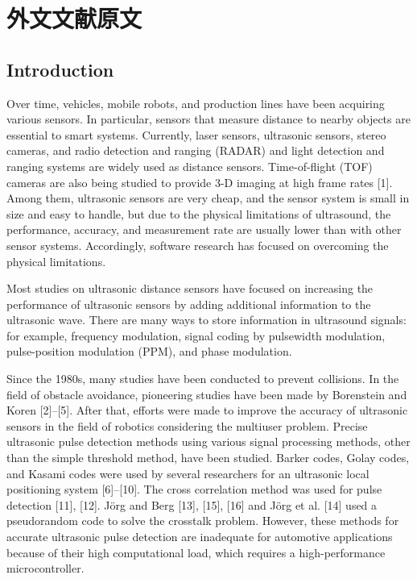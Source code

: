 \section{外文文献原文}
\subsection{Introduction}
Over time, vehicles, mobile robots, and production lines have been acquiring various sensors. In particular, sensors that measure distance to nearby objects are essential to smart systems. Currently, laser sensors, ultrasonic sensors, stereo cameras, and radio detection and ranging (RADAR) and light detection and ranging systems are widely used as distance sensors. Time-of-flight (TOF) cameras are also being studied to provide 3-D imaging at high frame rates [1]. Among them, ultrasonic sensors are very cheap, and the sensor system is small in size and easy to handle, but due to the physical limitations of ultrasound, the performance, accuracy, and measurement rate are usually lower than with other sensor systems. Accordingly, software research has focused on overcoming the physical limitations.

Most studies on ultrasonic distance sensors have focused on increasing the performance of ultrasonic sensors by adding additional information to the ultrasonic wave. There are many ways to store information in ultrasound signals: for example, frequency modulation, signal coding by pulsewidth modulation, pulse-position modulation (PPM), and phase modulation.

Since the 1980s, many studies have been conducted to prevent collisions. In the field of obstacle avoidance, pioneering studies have been made by Borenstein and Koren [2]–​[5]. After that, efforts were made to improve the accuracy of ultrasonic sensors in the field of robotics considering the multiuser problem. Precise ultrasonic pulse detection methods using various signal processing methods, other than the simple threshold method, have been studied. Barker codes, Golay codes, and Kasami codes were used by several researchers for an ultrasonic local positioning system [6]–​[10]. The cross correlation method was used for pulse detection [11], [12]. Jörg and Berg [13], [15], [16] and Jörg et al. [14] used a pseudorandom code to solve the crosstalk problem. However, these methods for accurate ultrasonic pulse detection are inadequate for automotive applications because of their high computational load, which requires a high-performance microcontroller.

